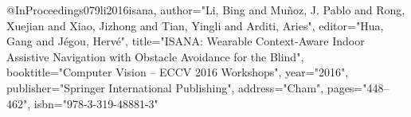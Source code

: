 @InProceedings{079li2016isana,
author="Li, Bing
and Mu{\~{n}}oz, J. Pablo
and Rong, Xuejian
and Xiao, Jizhong
and Tian, Yingli
and Arditi, Aries",
editor="Hua, Gang
and J{\'e}gou, Herv{\'e}",
title="ISANA: Wearable Context-Aware Indoor Assistive Navigation with Obstacle Avoidance for the Blind",
booktitle="Computer Vision -- ECCV 2016 Workshops",
year="2016",
publisher="Springer International Publishing",
address="Cham",
pages="448--462",
isbn="978-3-319-48881-3"
}